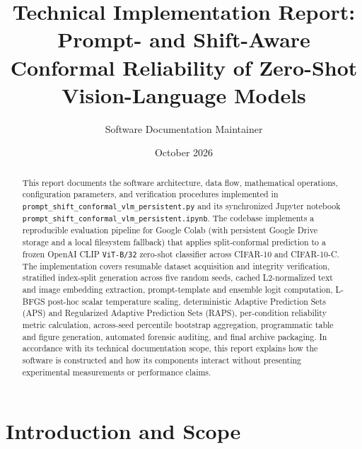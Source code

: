 \documentclass[11pt,a4paper]{article}
\title{Technical Implementation Report:\\Prompt- and Shift-Aware Conformal Reliability of Zero-Shot Vision-Language Models}
\author{Software Documentation Maintainer}
\date{October 2026}
\begin{document}
\maketitle

\begin{abstract}
This report documents the software architecture, data flow, mathematical operations, configuration parameters, and verification procedures implemented in \texttt{prompt\_\allowbreak{}shift\_\allowbreak{}conformal\_\allowbreak{}vlm\_\allowbreak{}persistent.py} and its synchronized Jupyter notebook \texttt{prompt\_\allowbreak{}shift\_\allowbreak{}conformal\_\allowbreak{}vlm\_\allowbreak{}persistent.ipynb}. The codebase implements a reproducible evaluation pipeline for Google Colab (with persistent Google Drive storage and a local filesystem fallback) that applies split-conformal prediction to a frozen OpenAI CLIP \texttt{ViT-B/\allowbreak{}32} zero-shot classifier across CIFAR-10 and CIFAR-10-C. The implementation covers resumable dataset acquisition and integrity verification, stratified index-split generation across five random seeds, cached L2-normalized text and image embedding extraction, prompt-template and ensemble logit computation, L-BFGS post-hoc scalar temperature scaling, deterministic Adaptive Prediction Sets (APS) and Regularized Adaptive Prediction Sets (RAPS), per-condition reliability metric calculation, across-seed percentile bootstrap aggregation, programmatic table and figure generation, automated forensic auditing, and final archive packaging. In accordance with its technical documentation scope, this report explains how the software is constructed and how its components interact without presenting experimental measurements or performance claims.
\end{abstract}

\vspace{6pt}
\tableofcontents
\vspace{10pt}

\section{Introduction and Scope}
\label{sec:intro}
\end{document}
